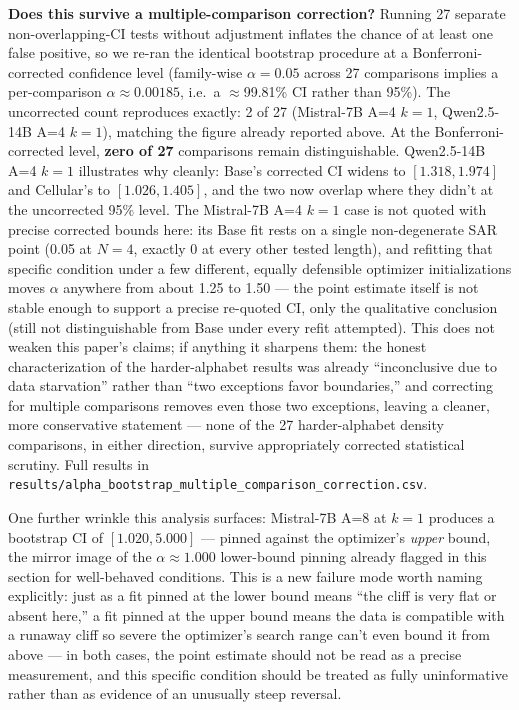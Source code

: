 \documentclass[11pt]{article}
\begin{document}
\textbf{Does this survive a multiple-comparison correction?} Running 27 separate non-overlapping-CI tests without adjustment inflates the chance of at least one false positive, so we re-ran the identical bootstrap procedure at a Bonferroni-corrected confidence level (family-wise $\alpha=0.05$ across 27 comparisons implies a per-comparison $\alpha\approx0.00185$, i.e.\ a $\approx$99.81\% CI rather than 95\%). The uncorrected count reproduces exactly: 2 of 27 (Mistral-7B A=4 $k=1$, Qwen2.5-14B A=4 $k=1$), matching the figure already reported above. At the Bonferroni-corrected level, \textbf{zero of 27} comparisons remain distinguishable. Qwen2.5-14B A=4 $k=1$ illustrates why cleanly: Base's corrected CI widens to $[1.318, 1.974]$ and Cellular's to $[1.026, 1.405]$, and the two now overlap where they didn't at the uncorrected 95\% level. The Mistral-7B A=4 $k=1$ case is not quoted with precise corrected bounds here: its Base fit rests on a single non-degenerate SAR point (0.05 at $N=4$, exactly 0 at every other tested length), and refitting that specific condition under a few different, equally defensible optimizer initializations moves $\alpha$ anywhere from about 1.25 to 1.50 --- the point estimate itself is not stable enough to support a precise re-quoted CI, only the qualitative conclusion (still not distinguishable from Base under every refit attempted). This does not weaken this paper's claims; if anything it sharpens them: the honest characterization of the harder-alphabet results was already ``inconclusive due to data starvation'' rather than ``two exceptions favor boundaries,'' and correcting for multiple comparisons removes even those two exceptions, leaving a cleaner, more conservative statement --- none of the 27 harder-alphabet density comparisons, in either direction, survive appropriately corrected statistical scrutiny. Full results in \texttt{results/alpha\_bootstrap\_multiple\_comparison\_correction.csv}.

One further wrinkle this analysis surfaces: Mistral-7B A=8 at $k=1$ produces a bootstrap CI of $[1.020, 5.000]$ --- pinned against the optimizer's \emph{upper} bound, the mirror image of the $\alpha\approx1.000$ lower-bound pinning already flagged in this section for well-behaved conditions. This is a new failure mode worth naming explicitly: just as a fit pinned at the lower bound means ``the cliff is very flat or absent here,'' a fit pinned at the upper bound means the data is compatible with a runaway cliff so severe the optimizer's search range can't even bound it from above --- in both cases, the point estimate should not be read as a precise measurement, and this specific condition should be treated as fully uninformative rather than as evidence of an unusually steep reversal.
\end{document}
